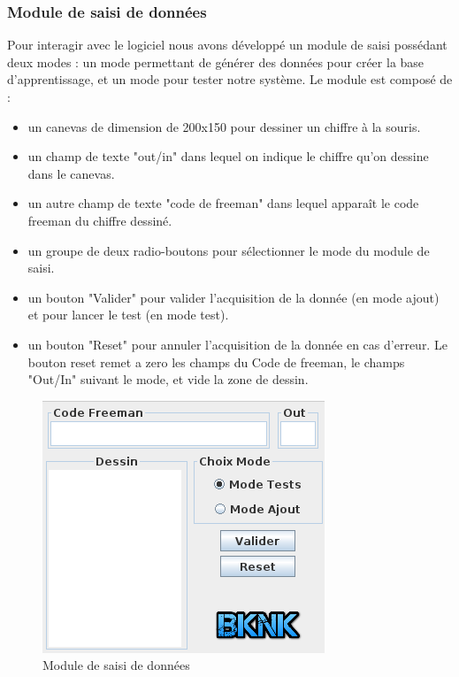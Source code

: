 \documentclass[10pt,a4paper]{report}
\begin{document}
\subsubsection{Module de saisi de données}
\begin{flushleft}
Pour interagir avec le logiciel nous avons développé un module de saisi possédant deux modes : un mode permettant de générer des données pour créer la base d'apprentissage, et un mode pour tester notre système.\newline \newline
Le module est composé de :

\begin{itemize}[label=$-$,leftmargin=*,parsep=0cm,itemsep=0.1cm,topsep=0cm]
\item un canevas de dimension de 200x150 pour dessiner un chiffre à la souris.

\item un champ de texte "out/in" dans lequel on indique le chiffre qu'on dessine dans le canevas.

\item un autre champ de texte "code de freeman" dans lequel apparaît le code freeman du chiffre dessiné.

\item un groupe de deux radio-boutons pour sélectionner le mode du module de saisi.

\item un bouton "Valider" pour valider l'acquisition de la donnée (en mode ajout) et pour lancer le test (en mode test).
\item un bouton "Reset" pour annuler l'acquisition de la donnée en cas d'erreur. Le bouton reset remet a zero les champs du Code de freeman, le champs "Out/In" suivant le mode, et vide la zone de dessin.
\end{itemize}

\end{flushleft}

\begin{figure}[!h]
	\center
		\includegraphics[scale=0.5]{./Ressource/Module_saisi.png}
 	\caption{Module de saisi de données}
\end{figure}
\end{document}
